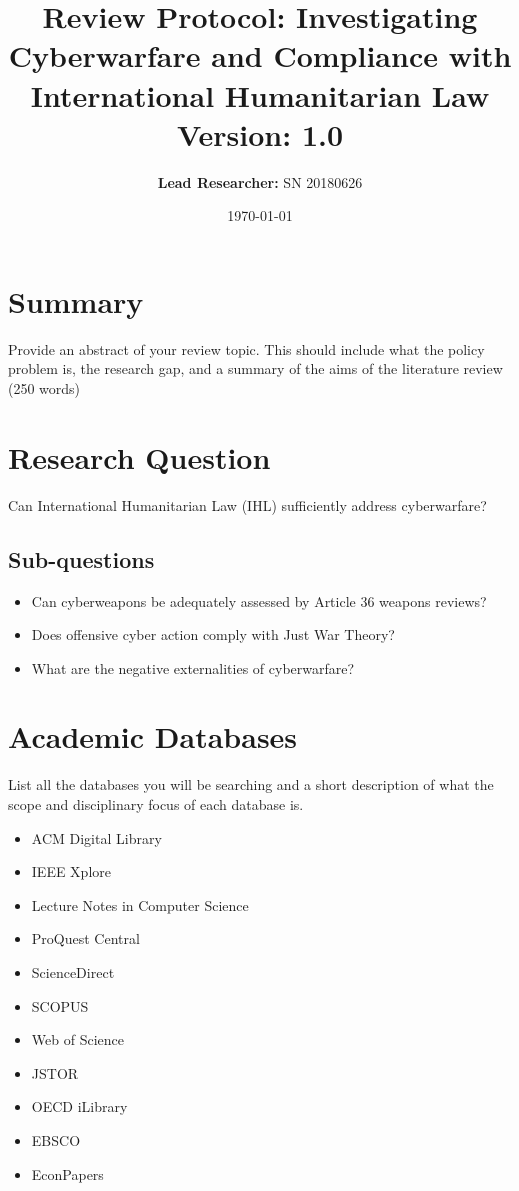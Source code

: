 \documentclass[a4paper,12pt]{article}
\title{\textbf{Review Protocol: Investigating Cyberwarfare and 
    Compliance with International Humanitarian Law \\
    \small{Version: 1.0}}}
\author{\textbf{Lead Researcher:} SN 20180626}
\date{\small{\today}}
\begin{document}
\maketitle

\section*{Summary}

\par Provide an abstract of your review topic. This should include 
what the policy problem is, the research gap, and a summary of the 
aims of the literature review (250 words)

\section*{Research Question}

\par Can International Humanitarian Law (IHL) sufficiently 
address cyberwarfare?

\subsection*{Sub-questions}

\begin{itemize}
    \item Can cyberweapons be adequately assessed by Article 36 
weapons reviews?
    \item Does offensive cyber action comply with Just War Theory?
    \item What are the negative externalities of cyberwarfare?
\end{itemize}

\section*{Academic Databases}

\par List all the databases you will be searching and a short 
description of what the scope and disciplinary focus of each database 
is.

\begin{itemize}
    \item ACM Digital Library
    \item IEEE Xplore
    \item Lecture Notes in Computer Science
    \item ProQuest Central
    \item ScienceDirect
    \item SCOPUS
    \item Web of Science
    \item JSTOR
    \item OECD iLibrary
    \item EBSCO
    \item EconPapers
\end{itemize}
\end{document}
